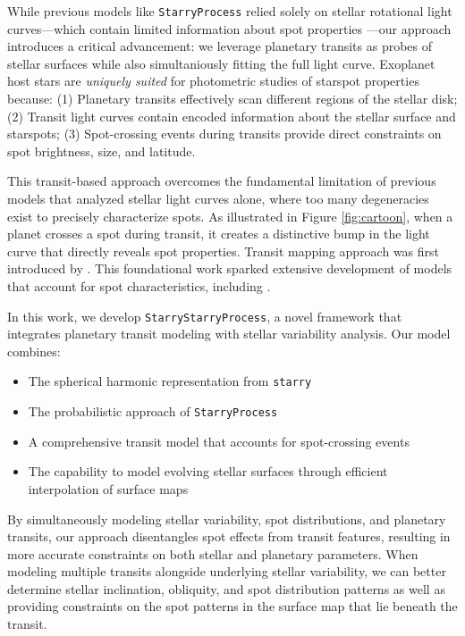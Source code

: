 \documentclass[twocolumn]{aastex631}
\newcommand{\sabinasays}[1]{{\color{purple}#1}}
\begin{document}
While previous models like \texttt{StarryProcess} relied solely on stellar
rotational light curves---which contain limited information about spot
properties \citep{Luger2021a}---our approach introduces a critical advancement:
we leverage planetary transits as probes of stellar surfaces \sabinasays{while also simultaniously fitting the full light curve}. 
Exoplanet host
stars are \textit{uniquely suited} for photometric studies of starspot
properties because: (1) Planetary transits effectively scan different regions of
the stellar disk; (2) Transit light curves contain encoded information about the
stellar surface and starspots; (3) Spot-crossing events during transits provide
direct constraints on spot brightness, size, and latitude.

This transit-based approach overcomes the fundamental limitation of previous models that analyzed stellar light curves alone, 
where too many degeneracies exist to precisely characterize spots. As illustrated in Figure \ref{fig:cartoon}, when a planet 
crosses a spot during transit, it creates a distinctive bump in the light curve that directly reveals spot properties. \sabinasays{Transit mapping approach was 
first introduced by \cite{Silva2003}. This foundational work sparked extensive development of models that account for 
spot characteristics, including 
\cite{Huber2010,Oshagh2013,Tregloan-Reed2013,Tregloan-Reed2015,Beky2014,Montalto2014,Maxted2016,Herrero2016,Juvan2018,Morris2017,Scandariato2017}.
}

In this work, we develop \texttt{StarryStarryProcess}, a novel framework that integrates planetary transit modeling with 
stellar variability analysis. Our model combines:
\begin{itemize}
    \item The spherical harmonic representation from \texttt{starry}
    \item The probabilistic approach of \texttt{StarryProcess}
    \item A comprehensive transit model that accounts for spot-crossing events
    \item The capability to model evolving stellar surfaces
    through efficient interpolation of surface maps
\end{itemize}

By simultaneously modeling stellar variability, spot distributions, and
planetary transits, our approach disentangles spot effects from transit
features, resulting in more accurate constraints on both stellar and planetary
parameters. When modeling multiple transits alongside underlying stellar
variability, we can better determine stellar inclination, obliquity, and spot
distribution patterns as well as providing constraints on the
spot patterns in the surface map that lie beneath the transit.
\end{document}
